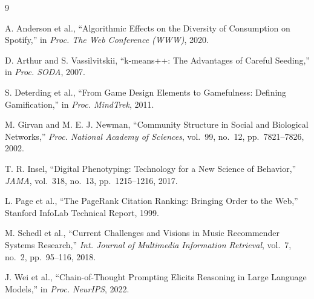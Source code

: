 \documentclass[conference]{IEEEtran}
\begin{document}
\begin{thebibliography}{9}

A. Anderson et al., ``Algorithmic Effects on the Diversity of Consumption on Spotify,'' in \textit{Proc. The Web Conference (WWW)}, 2020.

D. Arthur and S. Vassilvitskii, ``k-means++: The Advantages of Careful Seeding,'' in \textit{Proc. SODA}, 2007.

S. Deterding et al., ``From Game Design Elements to Gamefulness: Defining Gamification,'' in \textit{Proc. MindTrek}, 2011.

M. Girvan and M. E. J. Newman, ``Community Structure in Social and Biological Networks,'' \textit{Proc. National Academy of Sciences}, vol.~99, no.~12, pp.~7821--7826, 2002.

T. R. Insel, ``Digital Phenotyping: Technology for a New Science of Behavior,'' \textit{JAMA}, vol.~318, no.~13, pp.~1215--1216, 2017.

L. Page et al., ``The PageRank Citation Ranking: Bringing Order to the Web,'' Stanford InfoLab Technical Report, 1999.

M. Schedl et al., ``Current Challenges and Visions in Music Recommender Systems Research,'' \textit{Int. Journal of Multimedia Information Retrieval}, vol.~7, no.~2, pp.~95--116, 2018.

J. Wei et al., ``Chain-of-Thought Prompting Elicits Reasoning in Large Language Models,'' in \textit{Proc. NeurIPS}, 2022.

\end{thebibliography}
\end{document}

